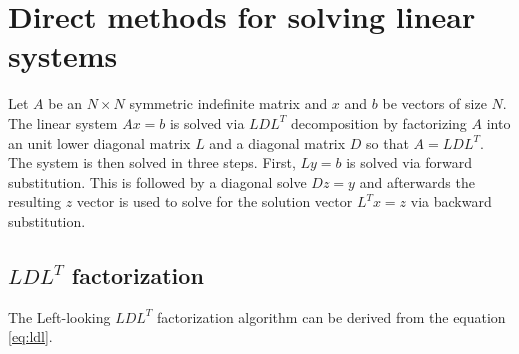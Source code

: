 \chapter{Direct methods for solving linear systems }

%
Let $A$ be an $N \times N$ symmetric indefinite matrix and $x$ and $b$ be vectors of size $N$.
The linear system $A x = b$ is solved via $LDL^T$ decomposition by factorizing $A$ into an unit lower diagonal matrix $L$ and a diagonal matrix $D$ so that $A = LDL^T$.
The system is then solved in three steps. First, $Ly=b$ is solved via forward substitution. This is followed by a diagonal solve $Dz=y$ and afterwards the resulting $z$ vector is used to solve for the solution vector  $L^Tx=z$ via backward substitution.

%
%
%
%
\section{$LDL^T$ factorization}

The Left-looking $LDL^T$ factorization algorithm can be derived from the equation \ref{eq:ldl}.

